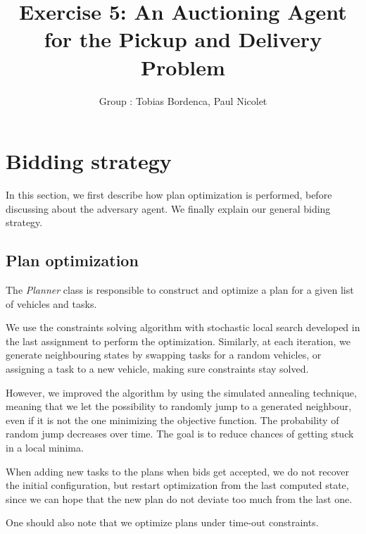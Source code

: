 \documentclass[11pt]{article}
\title{\bf Exercise 5: An Auctioning Agent for the Pickup and Delivery Problem}
\author{Group \textnumero 1: Tobias Bordenca, Paul Nicolet}
\begin{document}
\maketitle

\section{Bidding strategy}

In this section, we first describe how plan optimization is performed, before discussing about the adversary agent. We finally explain our general biding strategy.

\subsection{Plan optimization}
The \textit{Planner} class is responsible to construct and optimize a plan for a given list of vehicles and tasks.

We use the constraints solving algorithm with stochastic local search developed in the last assignment to perform the optimization. Similarly, at each iteration, we generate neighbouring states by swapping tasks for a random vehicles, or assigning a task to a new vehicle, making sure constraints stay solved.

However, we improved the algorithm by using the simulated annealing technique, meaning that we let the possibility to randomly jump to a generated neighbour, even if it is not the one minimizing the objective function. The probability of random jump decreases over time. The goal is to reduce chances of getting stuck in a local minima.

When adding new tasks to the plans when bids get accepted, we do not recover the initial configuration, but restart optimization from the last computed state, since we can hope that the new plan do not deviate too much from the last one.

One should also note that we optimize plans under time-out constraints.
\end{document}
